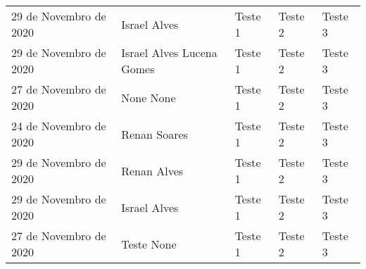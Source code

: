 \documentclass{article}%
\begin{document}
\begin{longtabu}{X[1.5l] X[2l] X[r] X[r] X[r]}
29 de Novembro de 2020&Israel Alves&Teste 1&Teste 2&Teste 3\\%
29 de Novembro de 2020&Israel Alves Lucena Gomes&Teste 1&Teste 2&Teste 3\\%
%
27 de Novembro de 2020&None None&Teste 1&Teste 2&Teste 3\\%
24 de Novembro de 2020&Renan Soares&Teste 1&Teste 2&Teste 3\\%
%
29 de Novembro de 2020&Renan Alves&Teste 1&Teste 2&Teste 3\\%
29 de Novembro de 2020&Israel Alves&Teste 1&Teste 2&Teste 3\\%
%
27 de Novembro de 2020&Teste None&Teste 1&Teste 2&Teste 3\\%
\end{longtabu}%
\end{document}
